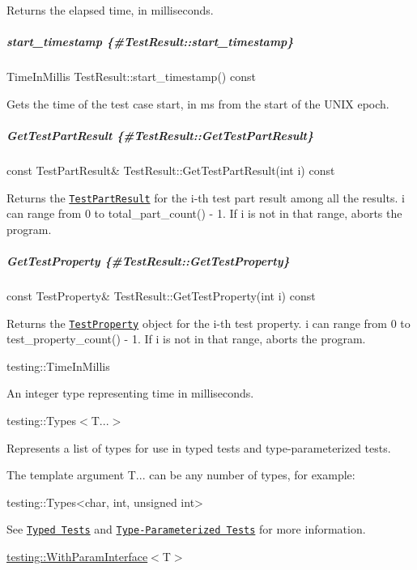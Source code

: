 Returns the elapsed time, in milliseconds.

\subparagraph*{start\+\_\+timestamp \{\#\+Test\+Result\+::start\+\_\+timestamp\}}

{\ttfamily Time\+In\+Millis Test\+Result\+::start\+\_\+timestamp() const}

Gets the time of the test case start, in ms from the start of the U\+N\+IX epoch.

\subparagraph*{Get\+Test\+Part\+Result \{\#\+Test\+Result\+::\+Get\+Test\+Part\+Result\}}

{\ttfamily const Test\+Part\+Result\& Test\+Result\+::\+Get\+Test\+Part\+Result(int i) const}

Returns the \href{#TestPartResult}{\tt {\ttfamily Test\+Part\+Result}} for the {\ttfamily i}-\/th test part result among all the results. {\ttfamily i} can range from 0 to {\ttfamily total\+\_\+part\+\_\+count() -\/ 1}. If {\ttfamily i} is not in that range, aborts the program.

\subparagraph*{Get\+Test\+Property \{\#\+Test\+Result\+::\+Get\+Test\+Property\}}

{\ttfamily const Test\+Property\& Test\+Result\+::\+Get\+Test\+Property(int i) const}

Returns the \href{#TestProperty}{\tt {\ttfamily Test\+Property}} object for the {\ttfamily i}-\/th test property. {\ttfamily i} can range from 0 to {\ttfamily test\+\_\+property\+\_\+count() -\/ 1}. If {\ttfamily i} is not in that range, aborts the program.

{\ttfamily testing\+::\+Time\+In\+Millis}

An integer type representing time in milliseconds.

{\ttfamily testing\+::\+Types$<$T...$>$}

Represents a list of types for use in typed tests and type-\/parameterized tests.

The template argument {\ttfamily T...} can be any number of types, for example\+:


\begin{DoxyCode}
testing::Types<char, int, unsigned int>
\end{DoxyCode}


See \href{../advanced.md#typed-tests}{\tt Typed Tests} and \href{../advanced.md#type-parameterized-tests}{\tt Type-\/\+Parameterized Tests} for more information.

{\ttfamily \mbox{\hyperlink{classtesting_1_1WithParamInterface}{testing\+::\+With\+Param\+Interface}}$<$T$>$}


